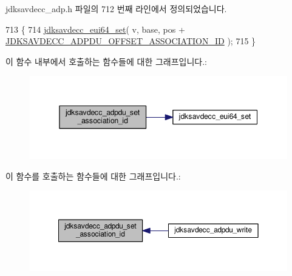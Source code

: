 jdksavdecc\+\_\+adp.\+h 파일의 712 번째 라인에서 정의되었습니다.


\begin{DoxyCode}
713 \{
714     \hyperlink{group__eui64_ga1c5b342315464ff77cbc7d587765432d}{jdksavdecc\_eui64\_set}( v, base, pos + 
      \hyperlink{group__adpdu_gad85e8e78a5189255a429b5bfe4b1751c}{JDKSAVDECC\_ADPDU\_OFFSET\_ASSOCIATION\_ID} );
715 \}
\end{DoxyCode}


이 함수 내부에서 호출하는 함수들에 대한 그래프입니다.\+:
\nopagebreak
\begin{figure}[H]
\begin{center}
\leavevmode
\includegraphics[width=345pt]{group__adpdu_gaf4bccd19420ecaf3e6e6af60d65b7960_cgraph}
\end{center}
\end{figure}




이 함수를 호출하는 함수들에 대한 그래프입니다.\+:
\nopagebreak
\begin{figure}[H]
\begin{center}
\leavevmode
\includegraphics[width=350pt]{group__adpdu_gaf4bccd19420ecaf3e6e6af60d65b7960_icgraph}
\end{center}
\end{figure}


